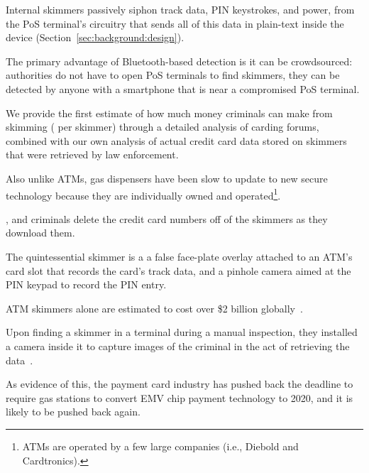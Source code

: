 
Internal skimmers passively siphon track data, PIN keystrokes, and power, from
the PoS terminal's circuitry that sends all of this data in plain-text inside
the device (Section~\ref{sec:background:design}).

%
The primary advantage of Bluetooth-based detection is it can be crowdsourced:
authorities do not have to open PoS terminals to find skimmers, they can be
detected by anyone with a smartphone that is near a compromised PoS terminal.
%

We provide the first estimate of how much money criminals can make from
skimming ( per skimmer) through a detailed analysis of carding
forums, combined with our own analysis of actual credit card data stored on
skimmers that were retrieved by law enforcement.
%


Also unlike ATMs, gas dispensers have been slow to update to new secure
technology because they are individually owned and operated\footnote{ATMs are
operated by a few large companies (i.e., Diebold and Cardtronics).}.

, and criminals delete the credit card numbers off of the skimmers as they
download them. 

The quintessential
skimmer is a a false face-plate overlay attached to an ATM's card slot that
records the card's track data, and a pinhole camera aimed at the PIN keypad to
record the PIN entry. 

ATM skimmers alone are estimated to cost over \$2 billion
globally~\cite{cnbc-skimmers}.

Upon finding a skimmer in a terminal during a manual inspection, they installed a
camera inside it to capture images of the criminal in the act of
retrieving the data~\cite{camera-in-pump}.

As evidence of this, the payment card industry has pushed back the deadline to
require gas stations to convert EMV chip payment technology to
2020, and it is likely to be pushed back again.



\fi %
